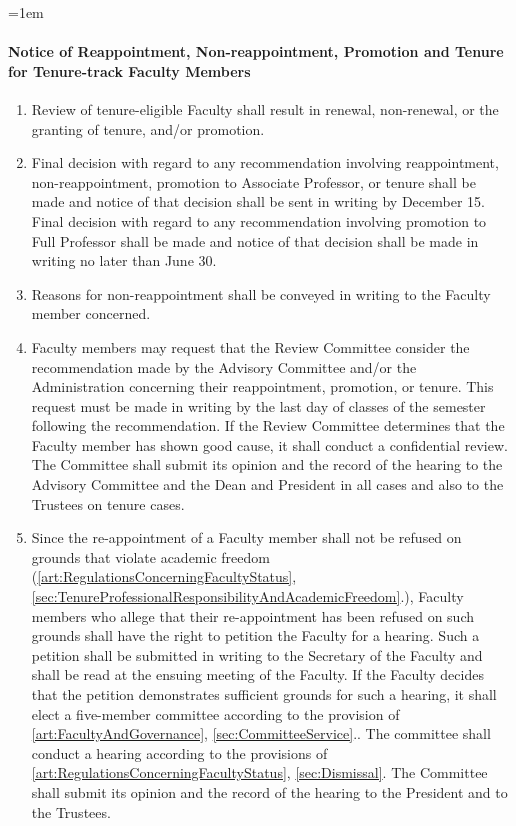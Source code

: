 \documentclass{manual}
\let\oldparagraph\paragraph
\renewcommand\paragraph{\leftskip=1em\oldparagraph}
\newcommand{\itemLevelA}{\alph*.}
\newcommand{\itemRefA}{\alph*}
\begin{document}
\paragraph{Notice of Reappointment, Non-reappointment, Promotion and Tenure for Tenure-track Faculty Members}

\begin{enumerate}[label=\itemLevelA,ref=\itemRefA]

\item Review of tenure-eligible Faculty shall result in renewal, non-renewal, or the granting of tenure, and/or promotion.


\item Final decision with regard to any recommendation involving reappointment, non-reappointment, promotion to Associate Professor, or tenure shall be made and notice of that decision shall be sent in writing by December 15. Final decision with regard to any recommendation involving promotion to Full Professor shall be made and notice of that decision shall be made in writing no later than June 30. 


\item Reasons for non-reappointment shall be conveyed in writing to the Faculty member concerned.


\item Faculty members may request that the Review Committee consider the recommendation made by the Advisory Committee and/or the Administration concerning their reappointment, promotion, or tenure. This request must be made in writing by the last day of classes of the semester following the recommendation. If the Review Committee determines that the Faculty member has shown good cause, it shall conduct a confidential review. The Committee shall submit its opinion and the record of the hearing to the Advisory Committee and the Dean and President in all cases and also to the Trustees on tenure cases.



\item Since the re-appointment of a Faculty member shall not be refused on grounds that violate academic freedom (\cref{art:RegulationsConcerningFacultyStatus}, \cref{sec:TenureProfessionalResponsibilityAndAcademicFreedom}.), Faculty members who allege that their re-appointment has been refused on such grounds shall have the right to petition the Faculty for a hearing. Such a petition shall be submitted in writing to the Secretary of the Faculty and shall be read at the ensuing meeting of the Faculty. If the Faculty decides that the petition demonstrates sufficient grounds for such a hearing, it shall elect a five-member committee according to the provision of \cref{art:FacultyAndGovernance}, \cref{sec:CommitteeService}.. The committee shall conduct a hearing according to the provisions of \cref{art:RegulationsConcerningFacultyStatus}, \cref{sec:Dismissal}. The Committee shall submit its opinion and the record of the hearing to the President and to the Trustees.
\end{enumerate}
\end{document}
